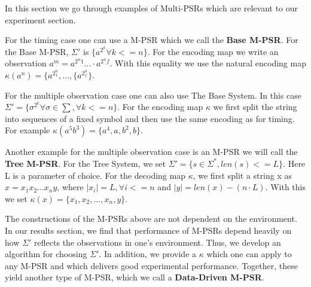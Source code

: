 
In this section we go through examples of Multi-PSRs which are relevant to our experiment section. 

For the timing case one can use a M-PSR which we call the \textbf{Base M-PSR}. For the Base M-PSR, $\Sigma'$ is  $\{a^{2^k} \forall k <= n\}$. For the encoding map we write an observation $a^m = a^{2^n1} ... \cdot a^{2^nf}$.  With this equality we use the natural encoding map $\kappa(a^n) = \{a^{2^n_1},...,\{a^{2^n_f}\}$. 

For the multiple observation case one can also use The Base System. In this case $\Sigma' = \{\sigma^{2^k}\forall \sigma \in \sum, \forall k <= n\}$. For the encoding map $\kappa$ we first split the string into sequences of a fixed symbol and then use the same encoding as for timing. For example $\kappa(a^5b^3)=\{a^4,a,b^2,b\}$.
 
Another example for the multiple observation case is an M-PSR we will call the \textbf{Tree M-PSR}. For the Tree System, we set $\Sigma'= \{s \in \Sigma^{*}, len(s)<= L\}$. Here L is a parameter of choice. For the decoding map $\kappa$, we first split a string x as $x=x_1x_2...x_ny$, where $|x_i|=L, \forall i<=n$ and $|y|=len(x) - (n \cdot L)$. With this we set $\kappa(x) = \{x_1,x_2,...,x_n,y\}$.

The constructions of the M-PSRs above are not dependent on the environment. In our results section, we find that performance of M-PSRs depend heavily on how $\Sigma'$ reflects the observations in one's environment. Thus, we develop an algorithm for choosing $\Sigma'$. In addition, we provide a $\kappa$ which one can apply to any M-PSR and which delivers good experimental performance. Together, these yield another type of M-PSR, which we call a \textbf{Data-Driven M-PSR}.
